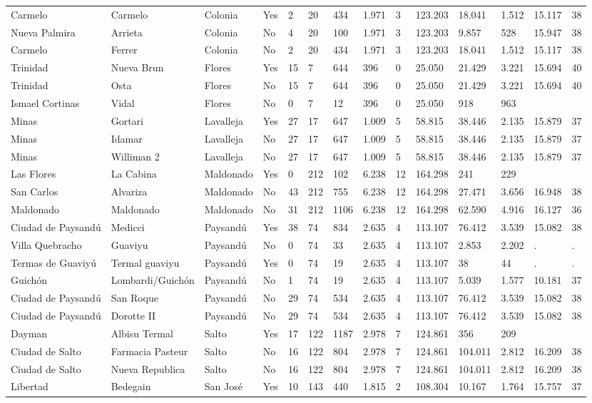 \documentclass[11pt]{article}
\begin{document}
\begin{landscape}
\begin{longtable}[htbp]{@{}p{1.2cm}p{1cm}p{1.5cm}p{1cm}p{1cm}p{1cm}p{1cm}p{1cm}p{1cm}p{1cm}p{1cm}p{1.2cm}p{1cm}p{1cm}@{}}
Carmelo	&	Carmelo	&	Colonia	&	Yes	&	2	&	20	&	434	&	1.971	&	3	&	123.203	&	18.041	&	1.512	&	15.117	&	38	\tabularnewline
Nueva Palmira	&	Arrieta	&	Colonia	&	No	&	4	&	20	&	100	&	1.971	&	3	&	123.203	&	9.857	&	528	&	15.947	&	38	\tabularnewline
Carmelo	&	Ferrer	&	Colonia	&	No	&	2	&	20	&	434	&	1.971	&	3	&	123.203	&	18.041	&	1.512	&	15.117	&	38	\tabularnewline
Trinidad	&	Nueva Brun	&	Flores	&	Yes	&	15	&	7	&	644	&	396	&	0	&	25.050	&	21.429	&	3.221	&	15.694	&	40	\tabularnewline
Trinidad	&	Osta	&	Flores	&	No	&	15	&	7	&	644	&	396	&	0	&	25.050	&	21.429	&	3.221	&	15.694	&	40	\tabularnewline
Ismael Cortinas	&	Vidal	&	Flores	&	No	&	0	&	7	&	12	&	396	&	0	&	25.050	&	918	&	963	&		&		\tabularnewline
Minas	&	Gortari	&	Lavalleja	&	Yes	&	27	&	17	&	647	&	1.009	&	5	&	58.815	&	38.446	&	2.135	&	15.879	&	37	\tabularnewline
Minas	&	Idamar	&	Lavalleja	&	No	&	27	&	17	&	647	&	1.009	&	5	&	58.815	&	38.446	&	2.135	&	15.879	&	37	\tabularnewline
Minas	&	Williman 2	&	Lavalleja	&	No	&	27	&	17	&	647	&	1.009	&	5	&	58.815	&	38.446	&	2.135	&	15.879	&	37	\tabularnewline
Las Flores	&	La Cabina	&	Maldonado	&	Yes	&	0	&	212	&	102	&	6.238	&	12	&	164.298	&	241	&	229	&		&		\tabularnewline
San Carlos	&	Alvariza	&	Maldonado	&	No	&	43	&	212	&	755	&	6.238	&	12	&	164.298	&	27.471	&	3.656	&	16.948	&	38	\tabularnewline
Maldonado	&	Maldonado	&	Maldonado	&	No	&	31	&	212	&	1106	&	6.238	&	12	&	164.298	&	62.590	&	4.916	&	16.127	&	36	\tabularnewline
Ciudad de Paysandú	&	Medicci	&	Paysandú	&	Yes	&	38	&	74	&	834	&	2.635	&	4	&	113.107	&	76.412	&	3.539	&	15.082	&	38	\tabularnewline
Villa Quebracho	&	Guaviyu	&	Paysandú	&	No	&	0	&	74	&	33	&	2.635	&	4	&	113.107	&	2.853	&	2.202	&	.	&	.	\tabularnewline
Termas de Guaviyú	&	Termal guaviyu	&	Paysandú	&	Yes	&	0	&	74	&	19	&	2.635	&	4	&	113.107	&	38	&	44	&	.	&	.	\tabularnewline
Guichón	&	Lombardi/Guichón	&	Paysandú	&	No	&	1	&	74	&	19	&	2.635	&	4	&	113.107	&	5.039	&	1.577	&	10.181	&	37	\tabularnewline
Ciudad de Paysandú	&	San Roque	&	Paysandú	&	No	&	29	&	74	&	534	&	2.635	&	4	&	113.107	&	76.412	&	3.539	&	15.082	&	38	\tabularnewline
Ciudad de Paysandú	&	Dorotte II	&	Paysandú	&	No	&	29	&	74	&	534	&	2.635	&	4	&	113.107	&	76.412	&	3.539	&	15.082	&	38	\tabularnewline
Dayman	&	Albisu Termal	&	Salto	&	Yes	&	17	&	122	&	1187	&	2.978	&	7	&	124.861	&	356	&	209	&		&		\tabularnewline
Ciudad de Salto	&	Farmacia Pasteur	&	Salto	&	No	&	16	&	122	&	804	&	2.978	&	7	&	124.861	&	104.011	&	2.812	&	16.209	&	38	\tabularnewline
Ciudad de Salto	&	Nueva Republica	&	Salto	&	No	&	16	&	122	&	804	&	2.978	&	7	&	124.861	&	104.011	&	2.812	&	16.209	&	38	\tabularnewline
Libertad	&	Bedegain	&	San José	&	Yes	&	10	&	143	&	440	&	1.815	&	2	&	108.304	&	10.167	&	1.764	&	15.757	&	37	\tabularnewline

\end{longtable}
\end{landscape}
\end{document}
